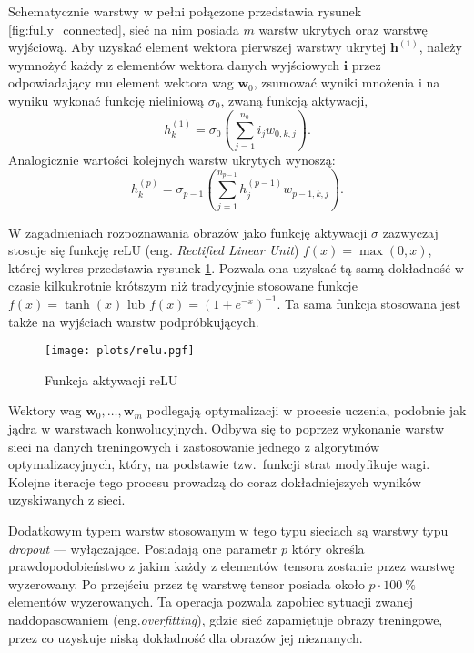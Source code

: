 \documentclass[pl,12pt]{aghdpl}
\begin{document}
Schematycznie warstwy w pełni połączone przedstawia rysunek
\ref{fig:fully_connected}, sieć na nim posiada $m$ warstw ukrytych oraz warstwę
wyjściową. Aby uzyskać element wektora pierwszej warstwy ukrytej $\bm h^{(1)}$,
należy wymnożyć każdy z elementów wektora danych wyjściowych $\bm i$ przez
odpowiadający mu element wektora wag $\bm w_{0}$, zsumować wyniki mnożenia i
na wyniku wykonać funkcję nieliniową $\sigma_0$, zwaną funkcją aktywacji,
\begin{equation}
  h_k^{(1)} = \sigma_0\left(\sum_{j=1}^{n_0}i_jw_{0,k,j}\right).
\end{equation}
Analogicznie wartości kolejnych warstw ukrytych wynoszą:
\begin{equation}
  h_k^{(p)} = \sigma_{p-1}\left(\sum_{j=1}^{n_{p-1}}h_j^{(p-1)}w_{p-1,k,j}\right).
\end{equation}

W zagadnieniach rozpoznawania obrazów jako funkcję aktywacji $\sigma$ zazwyczaj
stosuje się funkcję reLU (eng. \textit{Rectified Linear Unit}) $f(x) =
\max(0,x)$, której wykres przedstawia rysunek \ref{fig:reLU}. Pozwala ona
uzyskać tą samą dokładność w czasie kilkukrotnie krótszym niż tradycyjnie
stosowane funkcje $f(x) = \tanh(x)$ lub $f(x) = (1 + e^{-x})^{-1}$. Ta sama
funkcja stosowana jest także na wyjściach warstw podpróbkujących.

\begin{figure}[!tbh]
  \centering
  \texttt{[image: plots/relu.pgf]}
  \caption{Funkcja aktywacji reLU}
  \label{fig:reLU}
\end{figure}

Wektory wag $\bm w_0,\dotsc,\bm w_m$ podlegają optymalizacji w procesie
uczenia, podobnie jak jądra w warstwach konwolucyjnych. Odbywa się to poprzez
wykonanie warstw sieci na danych treningowych i zastosowanie jednego z
algorytmów optymalizacyjnych, który, na podstawie tzw.\ funkcji strat modyfikuje wagi.
Kolejne iteracje tego procesu prowadzą do coraz dokładniejszych wyników
uzyskiwanych z sieci.

Dodatkowym typem warstw stosowanym w tego typu sieciach są warstwy typu
\textit{dropout} --- wyłączające. Posiadają one parametr $p$ który określa
prawdopodobieństwo z jakim każdy z elementów tensora zostanie przez warstwę
wyzerowany. Po przejściu przez tę warstwę tensor posiada około
$p\cdot\SI{100}{\percent}$ elementów wyzerowanych. Ta operacja pozwala zapobiec
sytuacji zwanej naddopasowaniem (eng.\textit{overfitting}), gdzie sieć
zapamiętuje obrazy treningowe, przez co uzyskuje niską dokładność dla obrazów jej
nieznanych.
\end{document}
